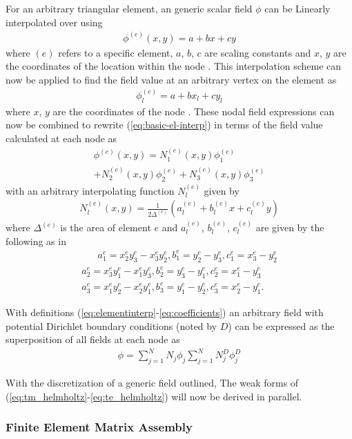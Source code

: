 For an arbitrary triangular element, an generic scalar field $\phi$ can be Linearly interpolated over using
\begin{align}
	\phi^{(e)}(x,y)=a+bx+cy
	\label{eq:basic-el-interp}
\end{align} 
where $(e)$ refers to a specific element, $a$, $b$, $c$ are scaling constants and $x$, $y$ are the coordinates of the location within the node \cite{jin2011theory}. This interpolation scheme can now be applied to find the field value at an arbitrary vertex on the element as
\begin{align}
	\phi^{(e)}_l=a+bx_l+cy_l
	\label{eq:node-interp}
\end{align}
where $x$, $y$ are the coordinates of the node \cite{jin2011theory}. These nodal field expressions can now be combined to rewrite (\ref{eq:basic-el-interp}) in terms of the field value calculated at each node as
\begin{multline}
	\phi^{(e)}(x,y)=N_1^{(e)}(x,y)\phi^{(e)}_1\\+N_2^{(e)}(x,y)\phi^{(e)}_2+N_3^{(e)}(x,y)\phi^{(e)}_3
	\label{eq:elementinterp}
\end{multline} with an arbitrary interpolating function $N_l^{(e)}$ given by 
\begin{align}
	N_l^{(e)}(x,y)=\frac{1}{2\Delta^{(e)}}\left(a_l^{(e)}+b_l^{(e)}x+c_l^{(e)}y\right)
\end{align}
where $\Delta^{(e)}$ is the area of element $e$ and $a_l^{(e)}$, $b_l^{(e)}$, $c_l^{(e)}$ are given by the following as in \cite{jin2011theory}
\begin{multline}
	\quad \ \ \ a_1^{e} = x^{e}_2y^{e}_3-x^{e}_3y^{e}_2,b_1^{e}=y^{e}_2-y^{e}_3, c_1^{e}=x^{e}_3-y^{e}_2
	\\
	a_2^{e} = x^{e}_3y^{e}_1-x^{e}_1y^{e}_3,b_2^{e}=y^{e}_3-y^{e}_1, c_2^{e}=x^{e}_1-y^{e}_3
	\\
	a_3^{e} = x^{e}_1y^{e}_2-x^{e}_2y^{e}_1,b_3^{e}=y^{e}_1-y^{e}_2, c_3^{e}=x^{e}_2-y^{e}_1.
	\label{eq:coefficients}
\end{multline}

With definitions (\ref{eq:elementinterp}-\ref{eq:coefficients}) an arbitrary field with potential Dirichlet boundary conditions (noted by $D$) can be expressed as the superposition of all fields at each node as 
\begin{align}
	\phi=\sum_{j=1}^{N}N_j\phi_j\sum_{j=1}^{N}N_j^D\phi_j^D
\end{align}

With the discretization of a generic field outlined, The weak forms of (\ref{eq:tm_helmholtz}-\ref{eq:te_helmholtz}) will now be derived in parallel.

\subsubsection{Finite Element Matrix Assembly}
\label{subsub:mat_assembly}